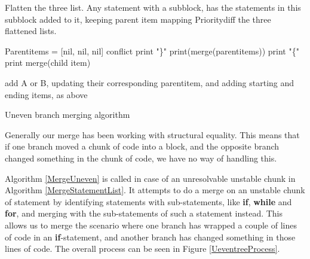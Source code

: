 \documentclass[11pt]{article}
\begin{document}
\begin{algorithm}
\begin{algorithmic}
    \State Flatten the three list. Any statement with a subblock, has the statements in this subblock added to it, keeping parent item mapping
    \State Prioritydiff the three flattened lists.

    \State Parentitems = [nil, nil, nil]
                \State \Return conflict
			\EndIf
                    \State print "\}"
                \EndIf
                    \State print(merge(parentitems))
                    	\State print "\{"
                    \EndIf
                \EndIf
			\EndIf
            \State print merge(child item)

                \State add A or B, updating their corresponding parentitem,
                \State and adding starting and ending items, as above
        \EndIf
   \EndFor

\EndFunction
\end{algorithmic}
\caption{Uneven branch merging algorithm}
\label{MergeUneven}
\end{algorithm}

Generally our merge has been working with structural equality. This means that if one branch moved a chunk of code into a block, and the opposite branch changed something in the chunk of code, we have no way of handling this.

Algorithm \ref{MergeUneven} is called in case of an unresolvable unstable chunk in Algorithm \ref{MergeStatementList}. It attempts to do a merge on an unstable chunk of statement by identifying statements with sub-statements, like \textbf{if}, \textbf{while} and \textbf{for}, and merging with the sub-statements of such a statement instead. This allows us to merge the scenario where one branch has wrapped a couple of lines of code in an \textbf{if}-statement, and another branch has changed something in those lines of code. The overall process can be seen in Figure \ref{UeventreeProcess}. 
\end{document}
